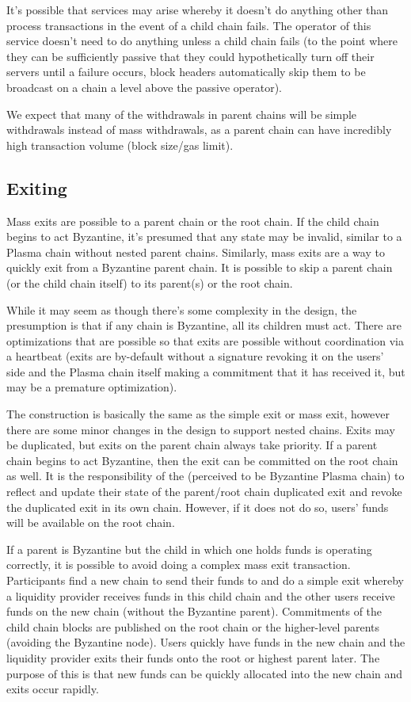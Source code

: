 \documentclass[letterpaper, 11pt]{article}
\begin{document}
It's possible that services may arise whereby it doesn't do anything other than
process transactions in the event of a child chain fails. The operator of this
service doesn't need to do anything unless a child chain fails (to the point
where they can be sufficiently passive that they could hypothetically turn off
their servers until a failure occurs, block headers automatically skip them to
be broadcast on a chain a level above the passive operator).

We expect that many of the withdrawals in parent chains will be simple
withdrawals instead of mass withdrawals, as a parent chain can have incredibly
high transaction volume (block size/gas limit).

\subsection{Exiting}

Mass exits are possible to a parent chain or the root chain. If the child chain
begins to act Byzantine, it's presumed that any state may be invalid, similar to
a Plasma chain without nested parent chains. Similarly, mass exits
are a way to quickly exit from a Byzantine parent chain. It is possible to skip
a parent chain (or the child chain itself) to its parent(s) or the root chain.

While it may seem as though there's some complexity in the design, the
presumption is that if any chain is Byzantine, all its children must act. There
are optimizations that are possible so that exits are possible without
coordination via a heartbeat (exits are by-default without a signature revoking
it on the users' side and the Plasma chain itself making a commitment that it
has received it, but may be a premature optimization).

The construction is basically the same as the simple exit or mass exit, however
there are some minor changes in the design to support nested chains. Exits may
be duplicated, but exits on the parent chain always take priority. If a parent
chain begins to act Byzantine, then the exit can be committed on the root chain
as well. It is the responsibility of the (perceived to be Byzantine Plasma
chain) to reflect and update their state of the parent/root chain duplicated
exit and revoke the duplicated exit in its own chain. However, if it does not do
so, users' funds will be available on the root chain.

If a parent is Byzantine but the child in which one holds funds is operating
correctly, it is possible to avoid doing a complex mass exit transaction.
Participants find a new chain to send their funds to and do a simple exit
whereby a liquidity provider receives funds in this child chain and the other
users receive funds on the new chain (without the Byzantine parent). Commitments
of the child chain blocks are published on the root chain or the higher-level
parents (avoiding the Byzantine node). Users quickly have funds in the new chain
and the liquidity provider exits their funds onto the root or highest parent
later. The purpose of this is that new funds can be quickly allocated into the
new chain and exits occur rapidly.
\end{document}
